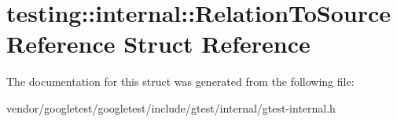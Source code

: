 \hypertarget{structtesting_1_1internal_1_1RelationToSourceReference}{}\section{testing\+:\+:internal\+:\+:Relation\+To\+Source\+Reference Struct Reference}
\label{structtesting_1_1internal_1_1RelationToSourceReference}


The documentation for this struct was generated from the following file\+:\begin{DoxyCompactItemize}
\item 
vendor/googletest/googletest/include/gtest/internal/gtest-\/internal.\+h\end{DoxyCompactItemize}
